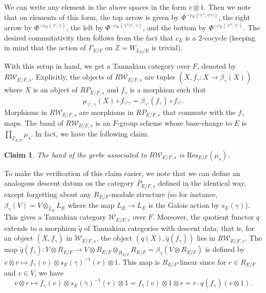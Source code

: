 \documentclass[11pt]{amsart}
\newtheorem{claim}[thm]{Claim}
\theoremstyle{definition}
\newcommand{\mc}{\mathcal}
\newcommand{\Z}{\mathbb{Z}}
\newcommand{\Res}{\mathrm{Res}}
\begin{document}
We can write any element in the above spaces in the form $v \otimes 1$. Then we note that on elements of this form, the top arrow is given by $\Phi^{-c_{E}(\gamma'',\gamma'\gamma)}$, the right arrow by $\Phi^{-c_{E}(\gamma',\gamma)}$, the left by $\Phi^{-c_{E}(\gamma''\gamma', \gamma)}$, and the bottom by $\Phi^{-c_{E}(\gamma'',\gamma')}$. The desired commutativity then follows from the fact that $c_{E}$ is a $2$-cocycle (keeping in mind that the action of $\Gamma_{E/F}$ on $\Z = W_{L_{E}/E}$ is trivial).

With this setup in hand, we get a Tannakian category over $F$, denoted by $R\mc{W}_{E/F,s}$. Explicitly, the objects of $R\mc{W}_{E/F, s}$ are tuples $(X, f_{\gamma}: X \to \beta_{\gamma}(X))$ where $X$ is an object of $RP_{E/F, s}$ and $f_{\gamma}$ is a morphism such that 
\begin{equation*}
    \mu_{\gamma', \gamma}(X) \circ f_{\gamma'\gamma} = \beta_{\gamma'}(f_{\gamma}) \circ f_{\gamma'}.
\end{equation*}
Morphisms in $R\mc{W}_{E/F, s}$ are morphisms in $RP_{E/F,s}$ that commute with the $f_{\gamma}$ maps. The band of $R\mc{W}_{E/F, s}$ is an $F$-group scheme whose base-change to $E$ is $\prod_{\Gamma_{E/F}} \mu_{s}$. In fact, we have the following claim.
\begin{claim}
The band of the gerbe associated to $R\mc{W}_{E/F,s}$ is $\Res_{E/F}(\mu_s)$.
\end{claim}
To make the verification of this claim easier, we note that we can define an analogous descent datum on the category $P_{E/F,s}$ defined in the identical way, except forgetting about any $R_{E/F}$-module structure (so for instance, $\beta_{\gamma}(V) = V \otimes_{L_E} L_E$ where the map $L_E \to L_E$ is the Galois action by $s_E(\gamma)$). This gives a Tannakian category $\mc{W}_{E/F,s}$ over $F$. Moreover, the quotient functor $q$ extends to a morphism $\tilde{q}$ of Tannakian categories with descent data; that is, for an object $(X, f_{\gamma})$ in $\mc{W}_{E/F,s}$, the object $(q(X), \tilde{q}(f_{\gamma}))$ lies in $R\mc{W}_{E/F,s}$. The map $\tilde{q}(f_{\gamma}): V \otimes R_{E/F} \to V \otimes R_{E/F} \otimes_{R_{E/F}} R_{E/F} =\beta_{\gamma}(V \otimes R_{E/F})$ is defined by $v \otimes r \mapsto f_{\gamma}(v) \otimes s_E(\gamma)^{-1}(r) \otimes 1$. This map is $R_{E/F}$-linear since for $r \in R_{E/F}$ and $v \in V$, we have
\begin{equation*}
    v \otimes r \mapsto f_{\gamma}(v) \otimes s_E(\gamma)^{-1}(r) \otimes 1 = f_{\gamma}(v) \otimes 1 \otimes r = r \cdot q(f_{\gamma})(v \otimes 1).
\end{equation*}
\end{document}
